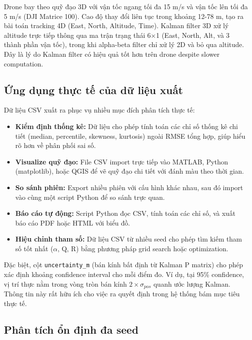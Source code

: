Drone bay theo quỹ đạo 3D với vận tốc ngang tối đa 15 m/s và vận tốc lên tối đa 5 m/s (DJI Matrice 100). Cao độ thay đổi liên tục trong khoảng 12-78 m, tạo ra bài toán tracking 4D (East, North, Altitude, Time). Kalman filter 3D xử lý altitude trực tiếp thông qua ma trận trạng thái 6×1 (East, North, Alt, và 3 thành phần vận tốc), trong khi alpha-beta filter chỉ xử lý 2D và bỏ qua altitude. Đây là lý do Kalman filter có hiệu quả tốt hơn trên drone despite slower computation.

\subsection{Ứng dụng thực tế của dữ liệu xuất}

\hspace{0.5cm} Dữ liệu CSV xuất ra phục vụ nhiều mục đích phân tích thực tế:

\begin{itemize}
\item \textbf{Kiểm định thống kê:} Dữ liệu cho phép tính toán các chỉ số thống kê chi tiết (median, percentile, skewness, kurtosis) ngoài RMSE tổng hợp, giúp hiểu rõ hơn về phân phối sai số.
\item \textbf{Visualize quỹ đạo:} File CSV import trực tiếp vào MATLAB, Python (matplotlib), hoặc QGIS để vẽ quỹ đạo chi tiết với đánh màu theo thời gian.
\item \textbf{So sánh phiên:} Export nhiều phiên với cấu hình khác nhau, sau đó import vào cùng một script Python để so sánh trực quan.
\item \textbf{Báo cáo tự động:} Script Python đọc CSV, tính toán các chỉ số, và xuất báo cáo PDF hoặc HTML với biểu đồ.
\item \textbf{Hiệu chỉnh tham số:} Dữ liệu CSV từ nhiều seed cho phép tìm kiếm tham số tốt nhất ($\alpha$, Q, R) bằng phương pháp grid search hoặc optimization.
\end{itemize}

Đặc biệt, cột \texttt{uncertainty\_m} (bán kính bất định từ Kalman P matrix) cho phép xác định khoảng confidence interval cho mỗi điểm đo. Ví dụ, tại 95\% confidence, vị trí thực nằm trong vòng tròn bán kính $2 \times \sigma_{pos}$ quanh ước lượng Kalman. Thông tin này rất hữu ích cho việc ra quyết định trong hệ thống bám mục tiêu thực tế.



\subsection{Phân tích ổn định đa seed}

